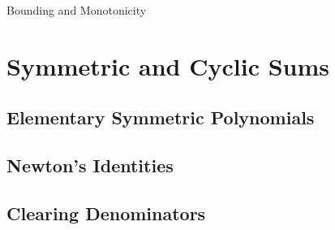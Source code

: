 \documentclass[../../../main.tex]{subfiles}
\begin{document}
Bounding and Monotonicity

\section{Symmetric and Cyclic Sums}

\subsection{Elementary Symmetric Polynomials}

\subsection{Newton's Identities}

\subsection{Clearing Denominators}
\end{document}
